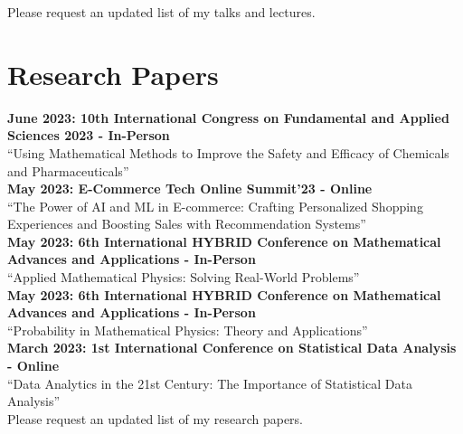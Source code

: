 \documentclass[a4paper,10pt]{article}
\begin{document}
Please request an updated list of my talks and lectures.

\section{\textbf{Research Papers}}
\textbf{June 2023: 10th International Congress on Fundamental and Applied Sciences 2023 - In-Person}\\
“Using Mathematical Methods to Improve the Safety and Efficacy of Chemicals and Pharmaceuticals”\\
\textbf{May 2023: E-Commerce Tech Online Summit’23 - Online}\\
“The Power of AI and ML in E-commerce: Crafting Personalized Shopping Experiences and Boosting Sales with Recommendation Systems”\\
\textbf{May 2023: 6th International HYBRID Conference on Mathematical Advances and Applications - In-Person}\\
“Applied Mathematical Physics: Solving Real-World Problems”\\
\textbf{May 2023: 6th International HYBRID Conference on Mathematical Advances and Applications - In-Person}\\
“Probability in Mathematical Physics: Theory and Applications”\\
\textbf{March 2023: 1st International Conference on Statistical Data Analysis - Online}\\
“Data Analytics in the 21st Century: The Importance of Statistical Data Analysis”\\

Please request an updated list of my research papers.


\end{document}
